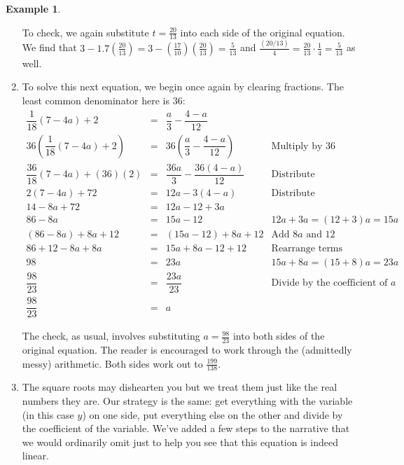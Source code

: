 \documentclass[11pt]{article}
\theoremstyle{definition}  %
\newtheorem{ex}{\bf Example}[section]
\begin{document}
\begin{ex}
\begin{enumerate}
To check, we again substitute $t = \frac{20}{13}$ into each side of the original equation.  We find that $3 - 1.7 \left(\frac{20}{13}\right) = 3 - \left(\frac{17}{10}\right)\left(\frac{20}{13}\right) =   \frac{5}{13}$ and $\frac{(20/13)}{4} = \frac{20}{13} \cdot \frac{1}{4} = \frac{5}{13}$ as well.

\item  To solve this next equation, we begin once again by clearing fractions.  The least common denominator here is $36$:\[ \begin{array}{rclr}

 \dfrac{1}{18}(7 - 4a) + 2 & = & \dfrac{a}{3} - \dfrac{4-a}{12} & \\[8pt]

36 \left(\dfrac{1}{18}(7 - 4a) + 2\right) & = & 36 \left(\dfrac{a}{3} - \dfrac{4-a}{12}\right) & \text{Multiply by $36$} \\[13pt]

\dfrac{36}{18} (7-4a) + (36)(2) & = & \dfrac{36a}{3} - \dfrac{36(4-a)}{12} & \text{Distribute} \\[5pt]

2(7-4a)  + 72 & = & 12 a - 3(4-a) & \text{Distribute} \\

14  - 8a + 72 & = & 12a - 12 + 3a & \\

86 - 8a & = & 15 a - 12 & \text{$12 a + 3a = (12+3)a = 15a$} \\

(86-8a)+8a+12 & = & (15a-12) + 8a + 12 & \text{Add $8a$ and $12$} \\

86 + 12 - 8a + 8a & = & 15a + 8a - 12 + 12 & \text{Rearrange terms} \\

98 & = & 23 a & \text{$15a + 8a = (15+8)a = 23a$} \\ [5pt]

\dfrac{98}{23} & = & \dfrac{23a}{23} & \text{Divide by the coefficient of $a$} \\[8pt]

\dfrac{98}{23} & = & a &

\end{array} \]

The check, as usual, involves substituting $a = \frac{98}{23}$ into both sides of the original equation.  The reader is encouraged to work through the (admittedly messy) arithmetic.  Both sides work out to $\frac{199}{138}$.


\item  The square roots may dishearten you but we treat them just like the real numbers they are.  Our strategy is the same:  get everything with the variable (in this case $y$) on one side, put everything else on the other and divide by the coefficient of the variable.  We've added a few steps to the narrative that we would ordinarily omit just to help you see that this equation is indeed linear.\[ \begin{array}{rclr}


\end{array}\]
\end{enumerate}
\end{ex}
\end{document}
